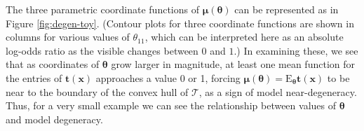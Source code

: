 \documentclass[]{article}
\theoremstyle{definition}
\begin{document}
The three parametric coordinate functions of
\(\boldsymbol \mu(\boldsymbol \theta)\) can be represented as in Figure
\ref{fig:degen-toy}. (Contour plots for three coordinate functions are
shown in columns for various values of \(\theta_{11}\), which can be
interpreted here as an absolute log-odds ratio as the visible changes
between \(0\) and \(1\).) In examining these, we see that as coordinates
of \(\boldsymbol \theta\) grow larger in magnitude, at least one mean
function for the entries of \(\boldsymbol t(\boldsymbol x)\) approaches
a value 0 or 1, forcing
\(\boldsymbol \mu(\boldsymbol \theta) = \text{E}_{\boldsymbol \theta} \boldsymbol t(\boldsymbol x)\)
to be near to the boundary of the convex hull of \(\mathcal{T}\), as a
sign of model near-degeneracy. Thus, for a very small example we can see
the relationship between values of \(\boldsymbol \theta\) and model
degeneracy.
\end{document}
